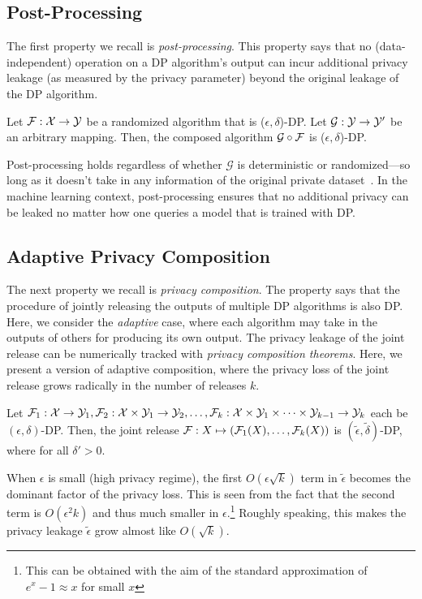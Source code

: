 \subsection{Post-Processing}
The first property we recall is \emph{post-processing}.
This property says that no (data-independent) operation on a DP algorithm's output can incur additional privacy leakage (as measured by the privacy parameter) beyond the original leakage of the DP algorithm.
\begin{prop}
Let $\mathcal{F}: \mathcal{X} \to \mathcal{Y}$ be a randomized algorithm that is ($\epsilon, \delta$)-DP.
Let $\mathcal{G}: \mathcal{Y} \to \mathcal{Y}'$ be an arbitrary mapping. 
Then, the composed algorithm $\mathcal{G} \circ \mathcal{F}$ is ($\epsilon, \delta$)-DP.
\end{prop}
Post-processing holds regardless of whether $\mathcal{G}$ is deterministic or randomized---so long as it doesn't take in any information of the original private dataset~\cite{dwork2014algorithmic}.
In the machine learning context, post-processing ensures that no additional privacy can be leaked no matter how one queries a model that is trained with DP.


\subsection{Adaptive Privacy Composition}
The next property we recall is \emph{privacy composition}.
The property says that the procedure of jointly releasing the outputs of multiple DP algorithms is also DP.
Here, we consider the \emph{adaptive} case, where each algorithm may take in the outputs of others for producing its own output.
The privacy leakage of the joint release can be numerically tracked with \emph{privacy composition theorems}.
Here, we present a version of adaptive composition, where the privacy loss of the joint release grows radically in the number of releases $k$.
\begin{theo}
Let $\mathcal{F}_1: \mathcal{X} \to \mathcal{Y}_1, \mathcal{F}_2: \mathcal{X} \times \mathcal{Y}_1 \to \mathcal{Y}_2, \dots, \mathcal{F}_k: \mathcal{X} \times \mathcal{Y}_1 \times \cdots \times \mathcal{Y}_{k-1} \to \mathcal{Y}_k$ each be $(\epsilon, \delta)$-DP.
Then, the joint release $\mathcal{F}: X \mapsto \left( \mathcal{F}_1(X), \dots, \mathcal{F}_k(X)\right)$ is $(\widetilde{\epsilon}, \widetilde{\delta})$-DP, where
for all $\delta' > 0$.
\end{theo}
When $\epsilon$ is small (high privacy regime), the first $O(\epsilon \sqrt{k})$ term in $\widetilde{\epsilon}$ becomes the dominant factor of the privacy loss. 
This is seen from the fact that the second term is $O(\epsilon^2 k)$ and thus much smaller in $\epsilon$.\footnote{This can be obtained with the aim of the standard approximation of $e^x - 1 \approx x$ for small $x$}
Roughly speaking, this makes the privacy leakage $\widetilde{\epsilon}$ grow almost like $O(\sqrt{k})$.


